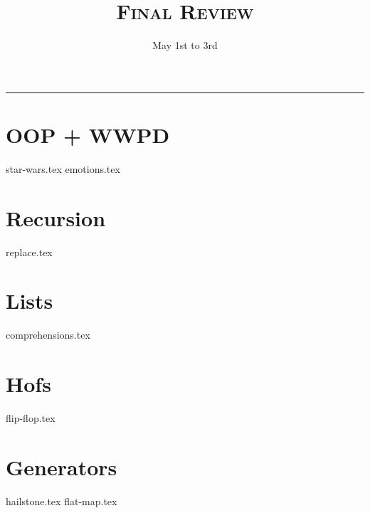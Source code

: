 \documentclass{exam}
\title{\textsc{Final Review}}
\date{May 1st to 3rd}
\begin{document}
\maketitle
\rule{\textwidth}{0.15em}
\fontsize{12}{15}\selectfont


\begin{questions}

\section{OOP + WWPD}
{star-wars.tex}
\newpage
{emotions.tex}
\newpage
\section{Recursion}
{replace.tex}
\newpage
\section{Lists}
{comprehensions.tex}
\newpage
\section{Hofs}
{flip-flop.tex}

\newpage
\section{Generators}
{hailstone.tex}
{flat-map.tex}



\end{questions}
\end{document}

